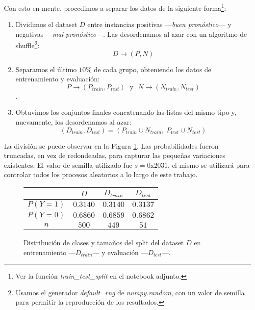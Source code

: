 Con esto en mente, procedimos a separar los datos de la siguiente forma\footnote{Ver la función \textit{train\_test\_split} en el notebook adjunto.}:

\begin{enumerate}
    \item Dividimos el dataset $D$ entre instancias positivas ---\textit{buen pronóstico}--- y negativas ---\textit{mal pronóstico}---. Las desordenamos al azar con un algoritmo de shuffle\footnote{Usamos el generador \textit{default\_rng} de \textit{numpy.random}, con un valor de semilla para permitir la reproducción de los resultados.}: $$D \rightarrow (P, N)$$
    \item Separamos el último $10\%$ de cada grupo, obteniendo los datos de entrenamiento y evaluación: $$P \rightarrow (P_{train}, P_{test})\ \ \ \text{y}\ \ \ N \rightarrow (N_{train}, N_{test})$$.
    \item Obtuvimos los conjuntos finales concatenando las listas del mismo tipo y, nuevamente, los desordenamos al azar: $$(D_{train}, D_{test}) = (P_{train} \cup N_{train},\ P_{test} \cup N_{test})$$
\end{enumerate}

\vspace{0.5em}
La división se puede observar en la Figura \ref{distribucion}. Las probabilidades fueron truncadas, en vez de redondeadas, para capturar las pequeñas variaciones existentes. El valor de semilla utilizado fue $s = \text{0x2031}$, el mismo se utilizará para controlar todos los procesos aleatorios a lo largo de este trabajo.

\vspace{0.5em}
\begin{figure}[!htbp]
    \begin{center}
        \begin{tabular}{ |c|c|c|c| } 
         \hline
                    & $D$      & $D_{train}$ & $D_{test}$ \\
        \hline
        $P(Y=1)$   & $0.3140$ & $0.3140$    & $0.3137$   \\ 
        $P(Y=0)$   & $0.6860$ & $0.6859$    & $0.6862$   \\ 
        $n$        & $500$    & $449$       & $51$       \\ 
        \hline
        \end{tabular}
    \end{center}
    \caption{Distribución de clases y tamaños del split del dataset $D$ en entrenamiento ---$D_{train}$--- y evaluación ---$D_{test}$---.} \label{distribucion}
\end{figure}
